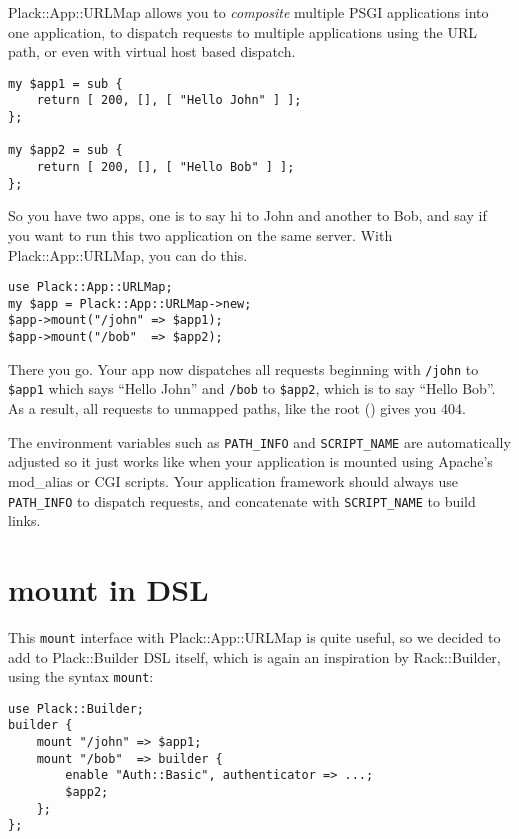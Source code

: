 Plack::App::URLMap allows you to \emph{composite} multiple PSGI
applications into one application, to dispatch requests to multiple
applications using the URL path, or even with virtual host based
dispatch.

\begin{lstlisting}
my $app1 = sub {
    return [ 200, [], [ "Hello John" ] ];
};

my $app2 = sub {
    return [ 200, [], [ "Hello Bob" ] ];
};
\end{lstlisting}

So you have two apps, one is to say hi to John and another to Bob, and
say if you want to run this two application on the same server. With
Plack::App::URLMap, you can do this.

\begin{lstlisting}
use Plack::App::URLMap;
my $app = Plack::App::URLMap->new;
$app->mount("/john" => $app1);
$app->mount("/bob"  => $app2);
\end{lstlisting}

There you go. Your app now dispatches all requests beginning with
\lstinline!/john! to \lstinline!$app1! which says ``Hello John'' and
\lstinline!/bob! to \lstinline!$app2!, which is to say ``Hello Bob''. As
a result, all requests to unmapped paths, like the root (\uri{/}) gives
you 404.

The environment variables such as \lstinline!PATH_INFO! and
\lstinline!SCRIPT_NAME! are automatically adjusted so it just works like
when your application is mounted using Apache's mod\_alias or CGI
scripts. Your application framework should always use
\lstinline!PATH_INFO! to dispatch requests, and concatenate with
\lstinline!SCRIPT_NAME! to build links.

\section{mount in DSL}\label{mount-in-dsl}

This \lstinline!mount! interface with Plack::App::URLMap is quite
useful, so we decided to add to Plack::Builder DSL itself, which is
again an inspiration by Rack::Builder, using the syntax
\lstinline!mount!:

\begin{lstlisting}
use Plack::Builder;
builder {
    mount "/john" => $app1;
    mount "/bob"  => builder {
        enable "Auth::Basic", authenticator => ...;
        $app2;
    };
};
\end{lstlisting}

